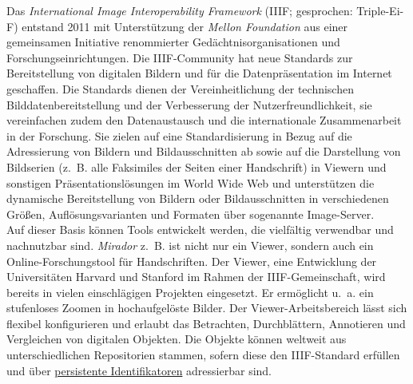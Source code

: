 \documentclass{article}
\begin{document}
    Das \emph{International Image Interoperability Framework} (IIIF;
                  gesprochen: Triple-Ei-F) entstand 2011 mit Unterstützung der \emph{Mellon Foundation} aus einer gemeinsamen Initiative renommierter
                  Gedächtnisorganisationen und Forschungseinrichtungen. Die IIIF-Community hat neue
                  Standards zur Bereitstellung von digitalen Bildern und für die Datenpräsentation
                  im Internet geschaffen. Die Standards dienen der Vereinheitlichung der technischen
                  Bilddatenbereitstellung und der Verbesserung der Nutzerfreundlichkeit, sie
                  vereinfachen zudem den Datenaustausch und die internationale Zusammenarbeit in der
                  Forschung. Sie zielen auf eine Standardisierung in Bezug auf die Adressierung von
                  Bildern und Bildausschnitten ab sowie auf die Darstellung von Bildserien (z. B.
                  alle Faksimiles der Seiten einer Handschrift) in Viewern und sonstigen
                  Präsentationslösungen im World Wide Web und unterstützen die dynamische
                  Bereitstellung von Bildern oder Bildausschnitten in verschiedenen Größen,
                  Auflösungsvarianten und Formaten über sogenannte Image-Server.\\
            
        Auf dieser Basis können Tools entwickelt werden, die vielfältig verwendbar und
                  nachnutzbar sind. \emph{Mirador} z. B. ist nicht nur ein Viewer,
                  sondern auch ein Online-Forschungstool für Handschriften. Der Viewer, eine
                  Entwicklung der Universitäten Harvard und Stanford im Rahmen der
                  IIIF-Gemeinschaft, wird bereits in vielen einschlägigen Projekten eingesetzt. Er
                  ermöglicht u. a. ein stufenloses Zoomen in hochaufgelöste Bilder. Der
                  Viewer-Arbeitsbereich lässt sich flexibel konfigurieren und erlaubt das
                  Betrachten, Durchblättern, Annotieren und Vergleichen von digitalen Objekten. Die
                  Objekte können weltweit aus unterschiedlichen Repositorien stammen, sofern diese
                  den IIIF-Standard erfüllen und über \href{http://gams.uni-graz.at/o:konde.12}{persistente Identifikatoren} adressierbar sind. \\
            
\end{document}

